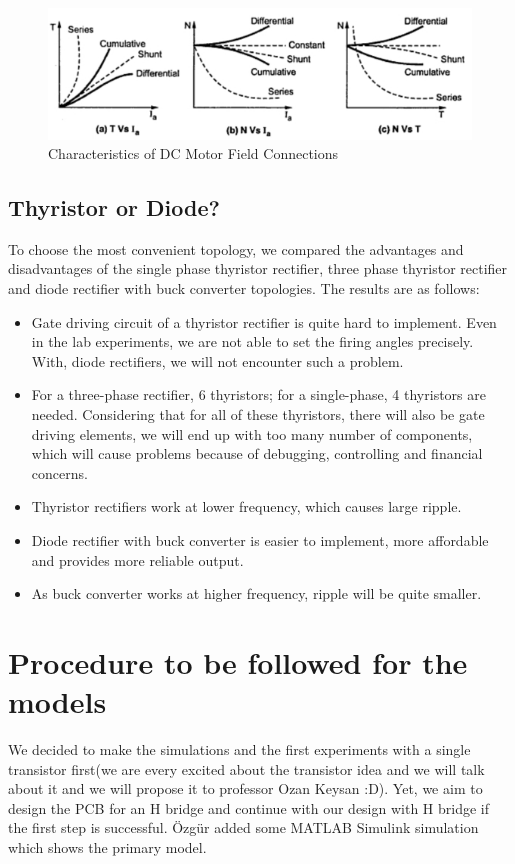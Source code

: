 \documentclass[10pt,a4paper]{article}
\begin{document}
\begin{figure}[!ht]
\centering
\includegraphics[scale=0.7]{char.jpeg} 
\caption{Characteristics of DC Motor Field Connections}
\label{fig:1}
\end{figure}


\subsection*{Thyristor or Diode?}
To choose the most convenient topology, we compared the advantages and disadvantages of the single phase thyristor rectifier, three phase thyristor rectifier and diode rectifier with buck converter topologies. The results are as follows:

\begin{itemize}
\item Gate driving circuit of a thyristor rectifier is quite hard to implement. Even in the lab experiments, we are not able to set the firing angles precisely. With, diode rectifiers, we will not encounter such a problem.
\item For a three-phase rectifier, 6 thyristors; for a single-phase, 4 thyristors are needed. Considering that for all of these thyristors, there will also be gate driving elements, we will end up with too many number of components, which will cause problems because of debugging, controlling and financial concerns.
\item Thyristor rectifiers work at lower frequency, which causes large ripple.
\item Diode rectifier with buck converter is easier to implement, more affordable and provides more reliable output.
\item As buck converter works at higher frequency, ripple will be quite smaller.

\end{itemize}

\section*{Procedure to be followed for the models}

We decided to make the simulations and the first experiments with a single transistor first(we are every excited about the transistor idea and we will talk about it and we will propose it to professor Ozan Keysan :D). Yet, we aim to design the PCB for an H bridge and continue with our design with H bridge if the first step is successful. Özgür added some MATLAB Simulink simulation which shows the primary model.
\end{document}
